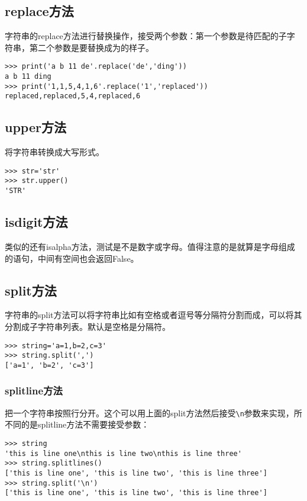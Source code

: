 \documentclass[12pt,oneside]{book}
\begin{document}
\begin{common-format}
\subsection{replace方法}
字符串的replace方法进行替换操作，接受两个参数：第一个参数是待匹配的子字符串，第二个参数是要替换成为的样子。
\begin{Verbatim}
>>> print('a b 11 de'.replace('de','ding'))
a b 11 ding
>>> print('1,1,5,4,1,6'.replace('1','replaced'))
replaced,replaced,5,4,replaced,6
\end{Verbatim}




\subsection{upper方法}
将字符串转换成大写形式。
\begin{Verbatim}
>>> str='str'
>>> str.upper()
'STR'
\end{Verbatim}


\subsection{isdigit方法}
类似的还有isalpha方法，测试是不是数字或字母。值得注意的是就算是字母组成的语句，中间有空间也会返回False。

\subsection{split方法}
字符串的split方法可以将字符串比如有空格或者逗号等分隔符分割而成，可以将其分割成子字符串列表。默认是空格是分隔符。
\begin{Verbatim}
>>> string='a=1,b=2,c=3'
>>> string.split(',')
['a=1', 'b=2', 'c=3']
\end{Verbatim}

\subsubsection{splitline方法}
把一个字符串按照行分开。这个可以用上面的split方法然后接受\verb+\n+参数来实现，所不同的是splitline方法不需要接受参数：
\begin{Verbatim}
>>> string
'this is line one\nthis is line two\nthis is line three'
>>> string.splitlines()
['this is line one', 'this is line two', 'this is line three']
>>> string.split('\n')
['this is line one', 'this is line two', 'this is line three']
\end{Verbatim}





\end{common-format}
\end{document}

